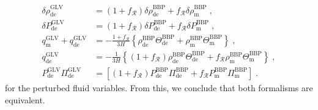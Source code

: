 \documentclass[nofootinbib,a4paper,aps,prd,10pt,superscriptaddress,reprint,showkeys,showpacs]{revtex4-1}
\newcommand{\qsubrm}[2]{{#1}_{\scriptscriptstyle{\textrm{#2}}}}
\begin{document}
\begin{align}
 \qsubrm{\delta\rho}{de}^{{\scriptscriptstyle{\textrm{GLV}}}} & = 
                                   (1+f_{\mathcal{R}})
                                   \qsubrm{\delta\rho}{de}^{{\scriptscriptstyle{\textrm{BBP}}}}+
                                   f_{\mathcal{R}}
                                   \qsubrm{\delta\rho}{m}^{{\scriptscriptstyle{\textrm{BBP}}}}\;,\nonumber\\
 \qsubrm{\delta P}{de}^{{\scriptscriptstyle{\textrm{GLV}}}} & = 
                                 (1+f_{\mathcal{R}})\qsubrm{\delta P}{de}^{{\scriptscriptstyle{\textrm{BBP}}}}+
                                 f_{\mathcal{R}}\qsubrm{\delta P}{m}^{{\scriptscriptstyle{\textrm{BBP}}}}\;,\nonumber\\
 \qsubrm{q}{m}^{{\scriptscriptstyle{\textrm{GLV}}}} + 
 \qsubrm{q}{de}^{{\scriptscriptstyle{\textrm{GLV}}}} & = 
                                    -\frac{1+f_{\mathcal{R}}}{3H}\left\{
                                    \qsubrm{\rho}{de}^{{\scriptscriptstyle{\textrm{BBP}}}}
                                    \qsubrm{\Theta}{de}^{{\scriptscriptstyle{\textrm{BBP}}}}+
                                    \qsubrm{\rho}{m}^{{\scriptscriptstyle{\textrm{BBP}}}}
                                    \qsubrm{\Theta}{m}^{{\scriptscriptstyle{\textrm{BBP}}}}\right\}\;,
                                    \nonumber\\
  \qsubrm{q}{de}^{{\scriptscriptstyle{\textrm{GLV}}}} & = 
                           -\frac{1}{3H}\left\{
                           (1+f_{\mathcal{R}})\qsubrm{\rho}{de}^{{\scriptscriptstyle{\textrm{BBP}}}}
                           \qsubrm{\Theta}{de}^{{\scriptscriptstyle{\textrm{BBP}}}}+
                           f_{\mathcal{R}}\qsubrm{\rho}{m}^{{\scriptscriptstyle{\textrm{BBP}}}}
                           \qsubrm{\Theta}{m}^{{\scriptscriptstyle{\textrm{BBP}}}}\right\}\;,
                           \nonumber\\
 \qsubrm{P}{de}^{{\scriptscriptstyle{\textrm{GLV}}}}
 \qsubrm{\Pi}{de}^{{\scriptscriptstyle{\textrm{GLV}}}} & = 
                                    \left[(1+f_{\mathcal{R}})
                                    \qsubrm{P}{de}^{{\scriptscriptstyle{\textrm{BBP}}}}
                                    \qsubrm{\Pi}{de}^{{\scriptscriptstyle{\textrm{BBP}}}}+
                                    f_{\mathcal{R}}
                                    \qsubrm{P}{m}^{{\scriptscriptstyle{\textrm{BBP}}}}
                                    \qsubrm{\Pi}{m}^{{\scriptscriptstyle{\textrm{BBP}}}}\right]\;. \nonumber
\end{align}
for the perturbed fluid variables. From this, we conclude that both formalisms are equivalent. 



\end{document}
